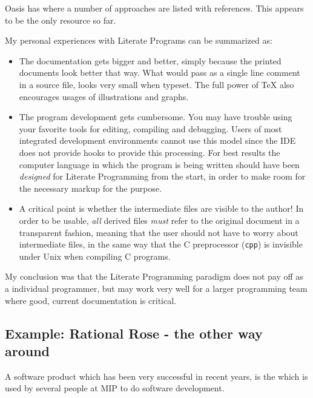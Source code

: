 Oasis has  where a number of
approaches are listed with references.  This appears to be the only
resource so far.

My personal experiences with Literate Programs can be summarized as:

\begin{itemize}
\item The documentation gets bigger and better, simply because the
  printed documents look better that way.  What would pass as a single
  line comment in a source file, looks very small when typeset.  The
  full power of {\TeX} also encourages usages of illustrations and
  graphs.

\item The program development gets cumbersome.  You may have trouble
  using your favorite tools for editing, compiling and debugging.
  Users of most integrated development environments cannot use this
  model since the IDE does not provide hooks to provide this
  processing.   For best results the computer language in which the
  program is being written should have been \textit{designed} for
  Literate Programming from the start, in order to make room for the
  necessary markup for the purpose.

\item

  A critical point is whether the intermediate files are visible to
  the author! In order to be usable, \textit{all} derived files
  \textit{must} refer to the original document in a transparent
  fashion, meaning that the user should not have to worry about
  intermediate files, in the same way that the C preprocessor
  (\texttt{cpp}) is invisible under Unix when compiling C programs.
\end{itemize}

My conclusion was that the Literate Programming paradigm does not pay
off as a individual programmer, but may work very well for a larger
programming team where good, current documentation is critical.

\subsection{Example: Rational Rose - the other way around}
\label{sec:rational-rose}

A software product which has been very successful in recent years, is
the  which is used by several people at MIP to
do software development.


